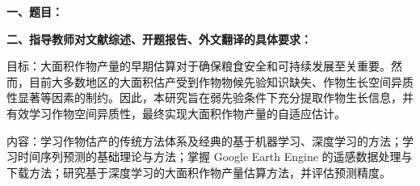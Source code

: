 {
    \setlength{\parindent}{0em}
    \par {\bfseries 一、题目：\Title}
    \\
    \par {\bfseries 二、指导教师对文献综述、开题报告、外文翻译的具体要求：}
    \par 目标：大面积作物产量的早期估算对于确保粮食安全和可持续发展至关重要。然而，目前大多数地区的大面积估产受到作物物候先验知识缺失、作物生长空间异质性显著等因素的制约。因此，本研究旨在弱先验条件下充分提取作物生长信息，并有效学习作物空间异质性，最终实现大面积作物产量的自适应估计。
    \par 内容：学习作物估产的传统方法体系及经典的基于机器学习、深度学习的方法；学习时间序列预测的基础理论与方法；掌握 Google Earth Engine 的遥感数据处理与下载方法；研究基于深度学习的大面积作物产量估算方法，并评估预测精度。
}

\mbox{} \vfill

\signature{指导教师（签名）}

